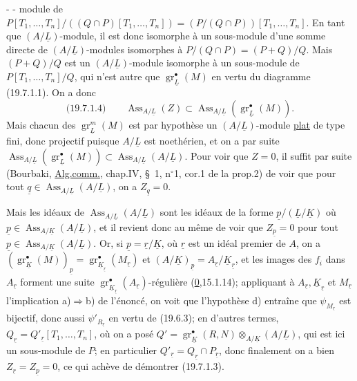 -  -
module de $P[T_1,\ldots,T_n]/((Q\cap P)[T_1,\ldots,T_n])=(P/(Q\cap P))[T_1,\ldots,T_n]$. En tant
que $(A/\underline L)$-module, il est donc isomorphe à un sous-module d'une somme
directe de $(A/\underline L)$-modules isomorphes à $P/(Q\cap P)=(P+Q)/Q$. Mais $(P+Q)/Q$
est un $(A/\underline L)$-module isomorphe à un sous-module de $P[T_1,\ldots,T_n]/Q$, qui
n'est autre que $\operatorname{gr}_{\underline L}^\bullet(M)$ en vertu du diagramme (19.7.1.1). On a donc
\[
\text{(19.7.1.4)}\qquad
\operatorname{Ass}_{A/\underline L}(Z)\subset
 \operatorname{Ass}_{A/\underline L}(\operatorname{gr}_{\underline L}^\bullet(M)).
\]
Mais chacun des $\operatorname{gr}_{\underline L}^m(M)$ est par hypothèse un $(A/\underline L)$-module \uline{plat} de type
fini, donc projectif puisque $A/\underline L$ est noethérien, et on a par suite
$\operatorname{Ass}_{A/\underline L}(\operatorname{gr}_{\underline L}^\bullet(M))
 \subset\operatorname{Ass}_{A/\underline L}(A/\underline L)$.
Pour voir que $Z=0$, il suffit par suite (Bourbaki, \uline{Alg.comm.}, chap.IV, \S~1,
n$^\circ$1, cor.1 de la prop.2) de voir que pour
tout 
$\underline q\in\operatorname{Ass}_{A/\underline L}(A/\underline L)$, on
 a $Z_{\underline q}=0$.

Mais les idéaux de $\operatorname{Ass}_{A/\underline L}(A/\underline L)$ sont les idéaux de la forme
$\underline p/(\underline L/\underline K)$ où
$\underline p\in\operatorname{Ass}_{A/\underline K}(A/\underline L)$, et il revient donc au même de voir que
$Z_{\underline p}=0$ pour tout
$\underline p\in\operatorname{Ass}_{A/\underline K}(A/\underline L)$.
Or, si $\underline p=\underline r/\underline K$, où $\underline r$ est un idéal premier de $A$, on a
$(\operatorname{gr}_{\underline K}^\bullet(M))_{\underline p}
 =\operatorname{gr}_{\underline K_{\underline r}}^\bullet(M_{\underline r})$
et $(A/\underline K)_{\underline p}=A_{\underline r}/\underline K_{\underline r}$,
et les images des $f_i$ dans $A_{\underline r}$ forment
une suite $\operatorname{gr}_{\underline K_{\underline r}}^\bullet(A_{\underline r})$-régulière
(\uline{0},15.1.14); appliquant à $A_{\underline r},\underline K_{\underline r}$ et
$M_{\underline r}$ l'implication a)$\Rightarrow$b) de l'énoncé, on voit que
l'hypothèse d) entraîne que $\psi_{M_{\underline r}}$ est bijectif, donc aussi
$\psi'_{R_{\underline r}}$ en vertu
de (19.6.3); en d'autres termes, $Q_{\underline r}=Q'_{\underline r}[T_1,\ldots,T_n]$,
où on a posé
$Q'=\operatorname{gr}_{\underline K}^\bullet(R,N)\otimes_{A/\underline K}(A/\underline L)$,
qui est ici un sous-module de $P$; en particulier
$Q'_{\underline r}=Q_{\underline r}\cap P_{\underline r}$, donc finalement on a bien
$Z_{\underline r}=Z_{\underline p}=0$, ce qui achève de
démontrer (19.7.1.3).

